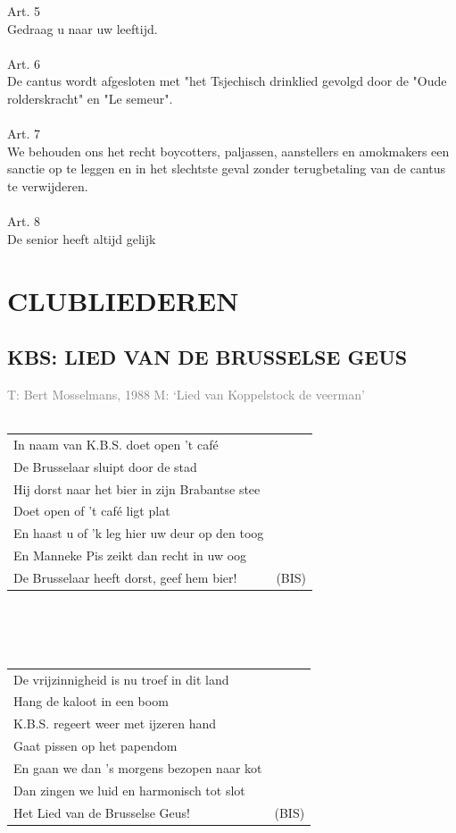 \documentclass{article}
\begin{document}
Art. 5\\
Gedraag u naar uw leeftijd.\\\\
Art. 6\\
De cantus wordt afgesloten met "het Tsjechisch drinklied gevolgd door de "Oude rolderskracht" en "Le semeur".\\\\
Art. 7\\
We behouden ons het recht boycotters, paljassen, aanstellers en amokmakers een sanctie op te leggen en in het slechtste geval zonder terugbetaling van de cantus te verwijderen.\\\\
Art. 8\\
De senior heeft altijd gelijk
\newpage
\thispagestyle{empty}
\section*{CLUBLIEDEREN}
\subsection*{KBS: LIED VAN DE BRUSSELSE GEUS}
\textcolor{gray}{\small T: Bert Mosselmans, 1988 M: ‘Lied van Koppelstock de veerman’}
\\\\
\begin{tabularx}{0.8\textwidth}{>{\raggedright\arraybackslash}X c}
    In naam van K.B.S. doet open ’t café \\
    De Brusselaar sluipt door de stad \\
    Hij dorst naar het bier in zijn Brabantse stee \\
    Doet open of ’t café ligt plat \\
    En haast u of ’k leg hier uw deur op den toog \\
    En Manneke Pis zeikt dan recht in uw oog \\
    De Brusselaar heeft dorst, geef hem bier! & (BIS)\\
\end{tabularx}
\\\\\\
\begin{tabularx}{0.8\textwidth}{>{\raggedright\arraybackslash}X c}
De vrijzinnigheid is nu troef in dit land\\
Hang de kaloot in een boom\\
K.B.S. regeert weer met ijzeren hand\\
Gaat pissen op het papendom\\
En gaan we dan ’s morgens bezopen naar kot\\
Dan zingen we luid en harmonisch tot slot\\
    Het Lied van de Brusselse Geus! & (BIS)\\
\end{tabularx}
\end{document}
